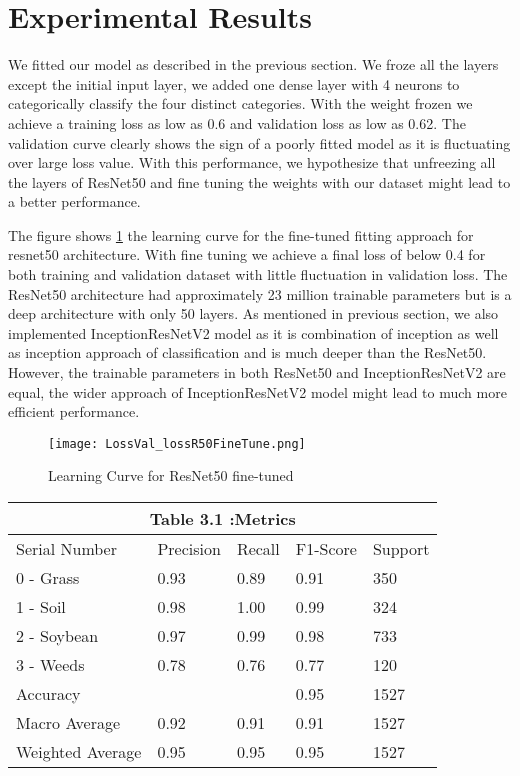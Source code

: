 \documentclass{report}
\begin{document}
\section{Experimental Results}
\label{sec:M5-results}
We fitted our model as described in the previous section. We froze all the layers except the initial input layer, we added one dense layer with 4 neurons to categorically classify the four distinct categories. With the weight frozen we achieve a training loss as low as 0.6 and validation loss as low as 0.62. The validation curve clearly shows the sign of a poorly fitted model as it is fluctuating over large loss value. With this performance, we hypothesize that unfreezing all the layers of ResNet50 and fine tuning the weights with our dataset might lead to a better performance. 

The figure shows \ref{fig:Fine-Tuned-m5} the learning curve for the fine-tuned fitting approach for resnet50 architecture. With fine tuning we achieve a final loss of below 0.4 for both training and validation dataset with little fluctuation in validation loss. The ResNet50 architecture had approximately 23 million trainable parameters but is a deep architecture with only 50 layers. As mentioned in previous section, we also implemented InceptionResNetV2 model as it is combination of inception as well as inception approach of classification and is much deeper than the ResNet50. However, the trainable parameters in both ResNet50 and InceptionResNetV2 are equal, the wider approach of InceptionResNetV2 model might lead to much more efficient performance. 

\begin{figure}[H]
    \centering
    \texttt{[image: LossVal\_lossR50FineTune.png]}
    \caption{Learning Curve for ResNet50 fine-tuned}
    \label{fig:Fine-Tuned-m5}
\end{figure}

\begin{tabular}[H]{ | p{3cm}||p{2cm}||p{2cm}||p{2cm}||p{2cm}|}
\hline
 \multicolumn{5}{|c|}{ Table 3.1 :Metrics }\\
 \hline
 Serial Number & Precision & Recall & F1-Score & Support\\
 \hline
 0 - Grass & 0.93 & 0.89 & 0.91 & 350 \\
 1 - Soil & 0.98 & 1.00 & 0.99 & 324\\
 2 - Soybean & 0.97 & 0.99 & 0.98 & 733\\
 3 - Weeds & 0.78 & 0.76 & 0.77 & 120 \\
 Accuracy &  &  & 0.95 & 1527\\
 Macro Average & 0.92 & 0.91 & 0.91 & 1527\\
 Weighted Average & 0.95 & 0.95 & 0.95 & 1527\\
 \hline
\end{tabular}
\end{document}
